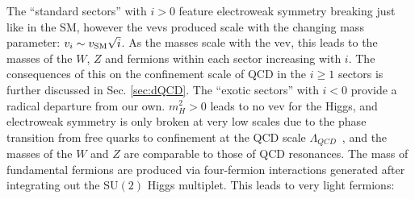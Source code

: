 \documentclass[nofootinbib,twocolumn,preprintnumbers]{revtex4-1}
\begin{document}
%
%
%
The ``standard sectors'' with $i>0$ feature electroweak symmetry breaking just like in the SM, however the vevs produced scale with the changing mass parameter: $v_i \sim v_{\rm SM}\sqrt{i}$. As the masses scale with the vev, this leads to the masses of the $W$, $Z$ and fermions within each sector increasing with $i$. The consequences of this on the confinement scale of QCD in the $i \geq 1$ sectors is further discussed in Sec. \ref{sec:dQCD}. 
The ``exotic sectors'' with $i<0$ provide a radical departure from our own. $m_H^2 > 0$ leads to no vev for the Higgs, and electroweak symmetry is only broken at very low scales due to the phase transition from free quarks to confinement at the QCD scale $\Lambda_{QCD}$~\cite{}, and the masses of the $W$ and $Z$ are comparable to those of QCD resonances. The mass of fundamental fermions are produced via four-fermion interactions generated after integrating out the SU$(2)$ Higgs multiplet. This leads to very light fermions: 
\end{document}
